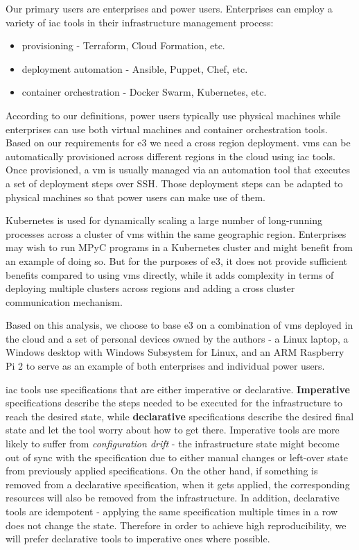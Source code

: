 Our primary users are enterprises and power users. Enterprises can
employ a variety of \gls{iac} tools in their infrastructure management
process:

\begin{itemize}
\tightlist
\item
  provisioning - Terraform\autocite{tfDocs}, Cloud
  Formation\autocite{cfDocs}, etc.
\item
  deployment automation - Ansible\autocite{ansibleDocs},
  Puppet\autocite{puppetDocs}, Chef\autocite{chefDocs}, etc.
\item
  container orchestration - Docker Swarm\autocite{dockerDocs},
  Kubernetes\autocite{kubeDocs}, etc.
\end{itemize}

According to our definitions, power users typically use physical
machines while enterprises can use both virtual machines and container
orchestration tools. Based on our requirements for \gls{e3} we need a
cross region deployment. \glspl{vm} can be automatically provisioned
across different regions in the cloud using \gls{iac} tools. Once
provisioned, a \gls{vm} is usually managed via an automation tool that
executes a set of deployment steps over SSH. Those deployment steps can
be adapted to physical machines so that power users can make use of
them.

Kubernetes is used for dynamically scaling a large number of
long-running processes across a cluster of \glspl{vm} within the same
geographic region. Enterprises may wish to run MPyC programs in a
Kubernetes cluster and might benefit from an example of doing so. But
for the purposes of \gls{e3}, it does not provide sufficient benefits
compared to using \glspl{vm} directly, while it adds complexity in terms
of deploying multiple clusters across regions and adding a cross cluster
communication mechanism.

Based on this analysis, we choose to base \gls{e3} on a combination of
\glspl{vm} deployed in the cloud and a set of personal devices owned by
the authors - a Linux laptop, a Windows desktop with Windows Subsystem
for Linux, and an ARM Raspberry Pi 2 to serve as an example of both
enterprises and individual power users.

\gls{iac} tools use specifications that are either imperative or
declarative. \textbf{Imperative} specifications describe the steps
needed to be executed for the infrastructure to reach the desired state,
while \textbf{declarative} specifications describe the desired final
state and let the tool worry about how to get there. Imperative tools
are more likely to suffer from \emph{configuration drift} - the
infrastructure state might become out of sync with the specification due
to either manual changes or left-over state from previously applied
specifications. On the other hand, if something is removed from a
declarative specification, when it gets applied, the corresponding
resources will also be removed from the infrastructure. In addition,
declarative tools are idempotent - applying the same specification
multiple times in a row does not change the state. Therefore in order to
achieve high reproducibility, we will prefer declarative tools to
imperative ones where possible.

